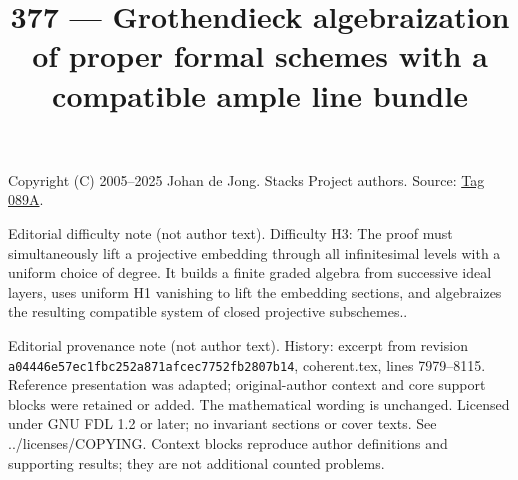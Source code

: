 \documentclass{amsart}
\theoremstyle{plain}
\theoremstyle{definition}
\theoremstyle{remark}
\numberwithin{equation}{subsection}
\begin{document}
\title[Stacks Project, Tag 089A]{377 --- Grothendieck algebraization of proper formal schemes with a compatible ample line bundle}
\maketitle
\noindent Copyright (C) 2005--2025 Johan de Jong. Stacks Project authors. Source: \href{https://stacks.math.columbia.edu/tag/089A}{Tag 089A}.

\noindent Editorial difficulty note (not author text). Difficulty H3: The proof must simultaneously lift a projective embedding through all infinitesimal levels with a uniform choice of degree. It builds a finite graded algebra from successive ideal layers, uses uniform H1 vanishing to lift the embedding sections, and algebraizes the resulting compatible system of closed projective subschemes..

\noindent Editorial provenance note (not author text). History: excerpt from revision \texttt{a0444\allowbreak 6e57e\allowbreak c1fbc\allowbreak 252a8\allowbreak 71afc\allowbreak ec775\allowbreak 2fb28\allowbreak 07b14}, coherent.tex, lines 7979--8115. Reference presentation was adapted; original-author context and core support blocks were retained or added. The mathematical wording is unchanged. Licensed under GNU FDL 1.2 or later; no invariant sections or cover texts. See ../licenses/COPYING. Context blocks reproduce author definitions and supporting results; they are not additional counted problems.
\end{document}
